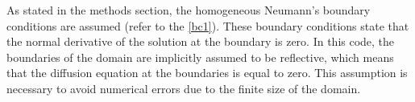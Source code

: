 As stated in the methods section, the homogeneous Neumann's boundary conditions are assumed (refer to the \eqref{bc1}). These boundary conditions state that the normal derivative of the solution at the boundary is zero. In this code, the boundaries of the domain are implicitly assumed to be reflective, which means that the diffusion equation at the boundaries is equal to zero. This assumption is necessary to avoid numerical errors due to the finite size of the domain.
 
